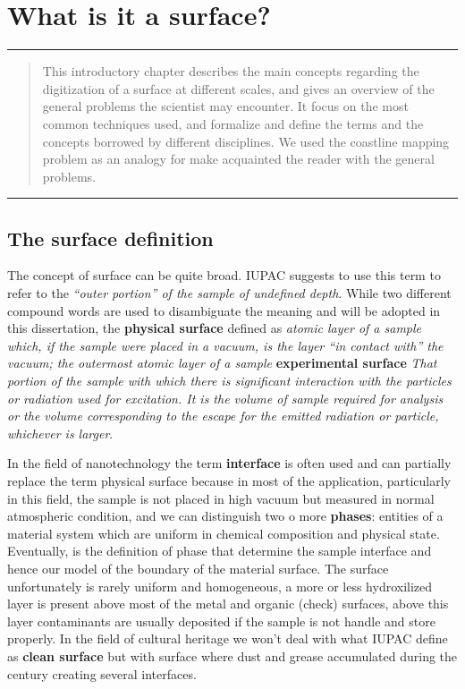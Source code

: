 \chapter{What is it a surface?}
\hrule
\vspace{10pt}
\begin{quote}
{ \small This introductory chapter describes the main concepts regarding the digitization of a surface at different scales, and gives an overview of the general problems the scientist may encounter. It focus on the most common techniques used, and formalize and define the terms and the concepts borrowed by different disciplines. We used the coastline mapping problem as an analogy for make acquainted the reader with the general problems. }
\end{quote}
\hrule


\section{The surface definition}
\label{sec:rapr}
The concept of surface  can be quite broad. IUPAC suggests to use this term to refer to the \textit{``outer portion'' of the sample of undefined depth}. While two different compound words are used to disambiguate the meaning and will be adopted in this dissertation, the \textbf{physical surface} defined as \textit{atomic layer of a sample which, if the sample were placed in a vacuum, is the layer ``in contact with'' the vacuum; the outermost atomic layer of a sample}
\textbf{experimental surface} \textit{That portion of the sample with which there is significant interaction with the particles or radiation used for excitation. It is the volume of sample required for analysis or the volume corresponding to the escape for the emitted radiation or particle, whichever is larger}.

In the field of nanotechnology the term \textbf{interface} is often used and can partially replace the term physical surface because in most of the application, particularly in this field, the sample is not placed in high vacuum but measured in normal atmospheric condition, and we can distinguish two o more \textbf{phases}: entities of a material system which are uniform in chemical composition and physical state. Eventually, is the definition of phase that determine the sample interface and hence our model of the boundary of the material surface. The surface unfortunately is rarely uniform and homogeneous, a more or less hydroxilized  layer is present above most of the metal and organic (check) surfaces, above this layer contaminants are usually deposited if the sample is not handle and store properly. In the field of cultural heritage we won't deal with what IUPAC define as \textbf{clean surface} but with surface where dust and grease accumulated during the century creating several interfaces.


